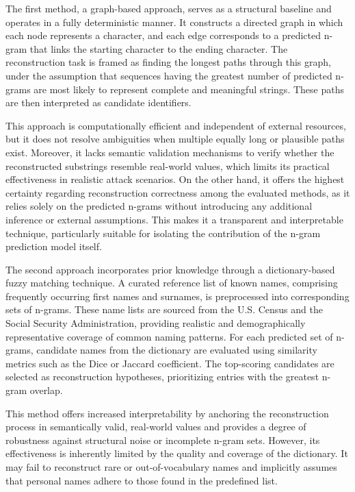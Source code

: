 The first method, a graph-based approach, serves as a structural baseline and operates in a fully deterministic manner.
It constructs a directed graph in which each node represents a character, and each edge corresponds to a predicted n-gram that links the starting character to the ending character.
The reconstruction task is framed as finding the longest paths through this graph, under the assumption that sequences having the greatest number of predicted n-grams are most likely to represent complete and meaningful strings.
These paths are then interpreted as candidate identifiers.

This approach is computationally efficient and independent of external resources, but it does not resolve ambiguities when multiple equally long or plausible paths exist.
Moreover, it lacks semantic validation mechanisms to verify whether the reconstructed substrings resemble real-world values, which limits its practical effectiveness in realistic attack scenarios.
On the other hand, it offers the highest certainty regarding reconstruction correctness among the evaluated methods, as it relies solely on the predicted n-grams without introducing any additional inference or external assumptions.
This makes it a transparent and interpretable technique, particularly suitable for isolating the contribution of the n-gram prediction model itself.

The second approach incorporates prior knowledge through a dictionary-based fuzzy matching technique.
A curated reference list of known names, comprising frequently occurring first names and surnames, is preprocessed into corresponding sets of n-grams.
These name lists are sourced from the U.S. Census and the Social Security Administration, providing realistic and demographically representative coverage of common naming patterns.
For each predicted set of n-grams, candidate names from the dictionary are evaluated using similarity metrics such as the Dice or Jaccard coefficient.
The top-scoring candidates are selected as reconstruction hypotheses, prioritizing entries with the greatest n-gram overlap.

This method offers increased interpretability by anchoring the reconstruction process in semantically valid, real-world values and provides a degree of robustness against structural noise or incomplete n-gram sets.
However, its effectiveness is inherently limited by the quality and coverage of the dictionary.
It may fail to reconstruct rare or out-of-vocabulary names and implicitly assumes that personal names adhere to those found in the predefined list.

